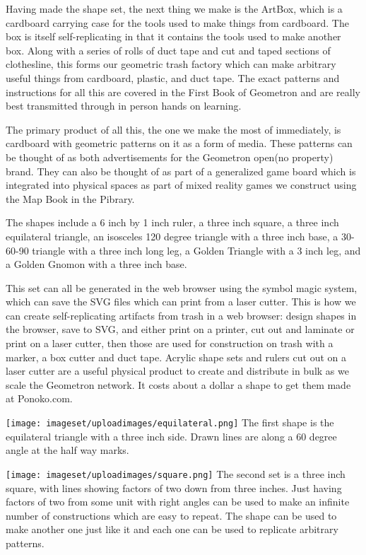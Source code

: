 Having made the shape set, the next thing we make is the ArtBox, which
is a cardboard carrying case for the tools used to make things from
cardboard. The box is itself self-replicating in that it contains the
tools used to make another box. Along with a series of rolls of duct
tape and cut and taped sections of clothesline, this forms our geometric
trash factory which can make arbitrary useful things from cardboard,
plastic, and duct tape. The exact patterns and instructions for all this
are covered in the First Book of Geometron and are really best
transmitted through in person hands on learning.

The primary product of all this, the one we make the most of
immediately, is cardboard with geometric patterns on it as a form of
media. These patterns can be thought of as both advertisements for the
Geometron open(no property) brand. They can also be thought of as part
of a generalized game board which is integrated into physical spaces as
part of mixed reality games we construct using the Map Book in the
Pibrary.

The shapes include a 6 inch by 1 inch ruler, a three inch square, a
three inch equilateral triangle, an isosceles 120 degree triangle with a
three inch base, a 30-60-90 triangle with a three inch long leg, a
Golden Triangle with a 3 inch leg, and a Golden Gnomon with a three inch
base.

This set can all be generated in the web browser using the symbol magic
system, which can save the SVG files which can print from a laser
cutter. This is how we can create self-replicating artifacts from trash
in a web browser: design shapes in the browser, save to SVG, and either
print on a printer, cut out and laminate or print on a laser cutter,
then those are used for construction on trash with a marker, a box
cutter and duct tape. Acrylic shape sets and rulers cut out on a laser
cutter are a useful physical product to create and distribute in bulk as
we scale the Geometron network. It costs about a dollar a shape to get
them made at Ponoko.com.

\texttt{[image: imageset/uploadimages/equilateral.png]} The first shape
is the equilateral triangle with a three inch side. Drawn lines are
along a 60 degree angle at the half way marks.

\texttt{[image: imageset/uploadimages/square.png]} The second set is a
three inch square, with lines showing factors of two down from three
inches. Just having factors of two from some unit with right angles can
be used to make an infinite number of constructions which are easy to
repeat. The shape can be used to make another one just like it and each
one can be used to replicate arbitrary patterns.

